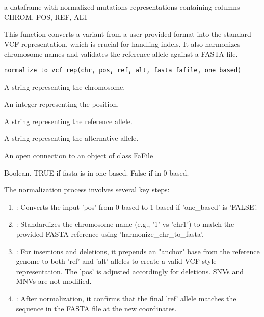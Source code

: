 \documentclass[a4paper]{book}
\begin{document}
%
\begin{Value}
a dataframe with normalized mutations representations containing columns CHROM, POS, REF, ALT
\end{Value}
%
\begin{Description}
This function converts a variant from a user-provided format into the
standard VCF representation, which is crucial for handling indels. It also
harmonizes chromosome names and validates the reference allele against a
FASTA file.
\end{Description}
%
\begin{Usage}
\begin{verbatim}
normalize_to_vcf_rep(chr, pos, ref, alt, fasta_fafile, one_based)
\end{verbatim}
\end{Usage}
%
\begin{Arguments}
\begin{ldescription}
\item[\code{chr}] A string representing the chromosome.

\item[\code{pos}] An integer representing the position.

\item[\code{ref}] A string representing the reference allele.

\item[\code{alt}] A string representing the alternative allele.

\item[\code{fasta\_fafile}] An open connection to an object of class FaFile

\item[\code{one\_based}] Boolean. TRUE if fasta is in one based. False if in 0 based.
\end{ldescription}
\end{Arguments}
%
\begin{Details}
The normalization process involves several key steps:
\begin{enumerate}

\item{} : Converts the input 'pos' from 0-based to 1-based if 'one\_based' is 'FALSE'.
\item{} : Standardizes the chromosome name (e.g., '1' vs 'chr1') to match the provided FASTA
reference using 'harmonize\_chr\_to\_fasta'.
\item{} : For insertions and deletions, it prepends an "anchor" base from the reference genome to both
'ref' and 'alt' alleles to create a valid VCF-style representation. The 'pos' is adjusted accordingly for
deletions. SNVs and MNVs are not modified.
\item{} : After normalization, it confirms that the final 'ref' allele matches the sequence in the FASTA file at the new coordinates.

\end{enumerate}

\end{Details}
\end{document}
